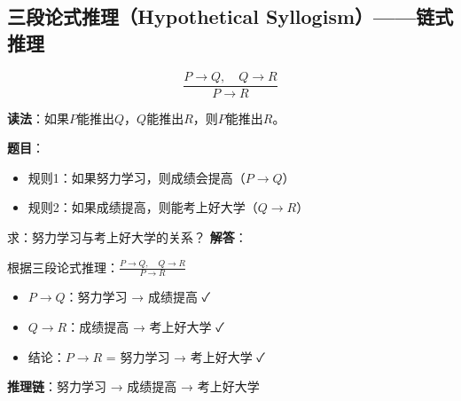 \subsection{三段论式推理（Hypothetical Syllogism）——链式推理}
\begin{formulabox}
$$\frac{P \to Q, \quad Q \to R}{P \to R}$$

\textbf{读法}：如果$P$能推出$Q$，$Q$能推出$R$，则$P$能推出$R$。
\end{formulabox}

\begin{examplebox}[例题3.5 三段论式推理]
\textbf{题目}：
\begin{itemize}[itemsep=0pt]
    \item 规则1：如果努力学习，则成绩会提高（$P \to Q$）
    \item 规则2：如果成绩提高，则能考上好大学（$Q \to R$）
\end{itemize}
求：努力学习与考上好大学的关系？
\tcblower
\textbf{解答}：

根据三段论式推理：$\frac{P \to Q, \quad Q \to R}{P \to R}$

\begin{itemize}[itemsep=0pt]
    \item $P \to Q$：努力学习 → 成绩提高 ✓
    \item $Q \to R$：成绩提高 → 考上好大学 ✓
    \item 结论：$P \to R$ = 努力学习 → 考上好大学 ✓
\end{itemize}

\textbf{推理链}：努力学习 → 成绩提高 → 考上好大学
\end{examplebox}

